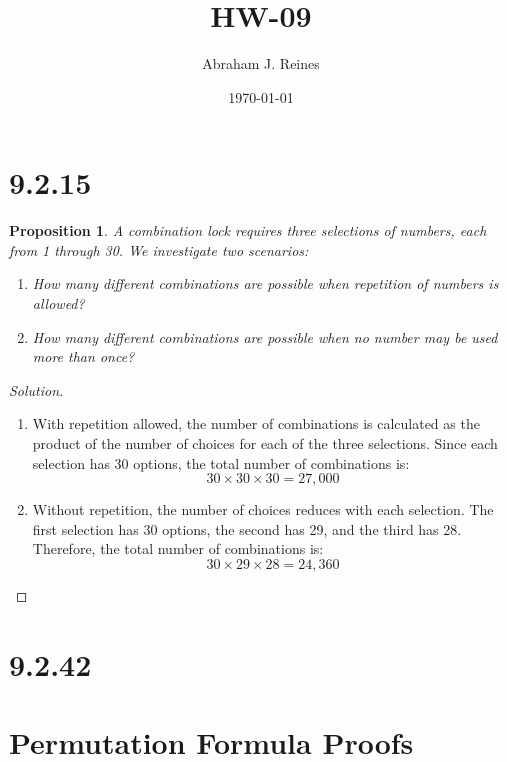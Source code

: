 \documentclass[12pt]{article}
\newtheorem{proposition}{Proposition}
\begin{document}
\doublespacing %

\title{HW-09}
\author{Abraham J. Reines}
\date{\today}
\maketitle

\section{9.2.15}

\begin{proposition}
A combination lock requires three selections of numbers, each from 1 through 30. We investigate two scenarios:
\begin{enumerate}
    \item How many different combinations are possible when repetition of numbers is allowed?
    \item How many different combinations are possible when no number may be used more than once?
\end{enumerate}
\end{proposition}

\begin{proof}[Solution]
\begin{enumerate}
    \item With repetition allowed, the number of combinations is calculated as the product of the number of choices for each of the three selections. Since each selection has 30 options, the total number of combinations is:
    \[ 30 \times 30 \times 30 = 27,000 \]
    
    \item Without repetition, the number of choices reduces with each selection. The first selection has 30 options, the second has 29, and the third has 28. Therefore, the total number of combinations is:
    \[ 30 \times 29 \times 28 = 24,360 \]
\end{enumerate}
\end{proof}

\section{9.2.42}

\section*{Permutation Formula Proofs}
\end{document}
